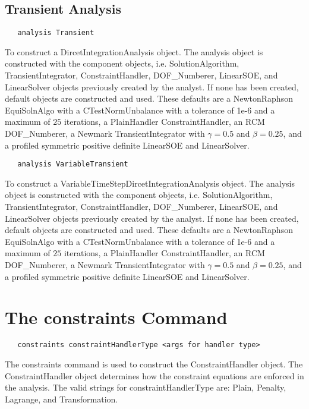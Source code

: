 \documentclass[12pt]{article}
\begin{document}
\subsection{Transient Analysis}

{\sf\small
\begin{verbatim}
   analysis Transient
\end{verbatim}
}

To construct a DircetIntegrationAnalysis object. The analysis object is
constructed with the component objects, i.e. SolutionAlgorithm,
TransientIntegrator, ConstraintHandler, DOF\_Numberer, LinearSOE, and
LinearSolver objects previously created by the analyst. If none has been  
created, default objects are constructed and used. These defaults are
a NewtonRaphson EquiSolnAlgo with a CTestNormUnbalance with a
tolerance of 1e-6 and a maximum of $25$ iterations, a PlainHandler
ConstraintHandler, an RCM DOF\_Numberer, a Newmark
TransientIntegrator with $\gamma = 0.5$ and $\beta = 0.25$, and a profiled
symmetric positive definite LinearSOE and LinearSolver.


{\sf\small
\begin{verbatim}
   analysis VariableTransient
\end{verbatim}
}

To construct a VariableTimeStepDircetIntegrationAnalysis object. The
analysis object is constructed with the component objects,
i.e. SolutionAlgorithm, TransientIntegrator, ConstraintHandler,
DOF\_Numberer, LinearSOE, and LinearSolver objects previously created
by the analyst. If none has been created, default objects are
constructed and used. These defaults are a NewtonRaphson EquiSolnAlgo
with a CTestNormUnbalance with a tolerance of 1e-6 and a maximum
of $25$ iterations, a PlainHandler ConstraintHandler, an RCM
DOF\_Numberer, a Newmark TransientIntegrator with $\gamma = 0.5$ and
$\beta = 0.25$, and a profiled symmetric positive definite LinearSOE
and LinearSolver. 


\section {The constraints Command}
{\sf\small
\begin{verbatim}
   constraints constraintHandlerType <args for handler type>
\end{verbatim}
}

The constraints command is used to construct the ConstraintHandler
object. The ConstraintHandler object determines how the constraint
equations are enforced in the analysis. The valid strings for
constraintHandlerType are: Plain, Penalty, Lagrange, and Transformation.
\end{document}
